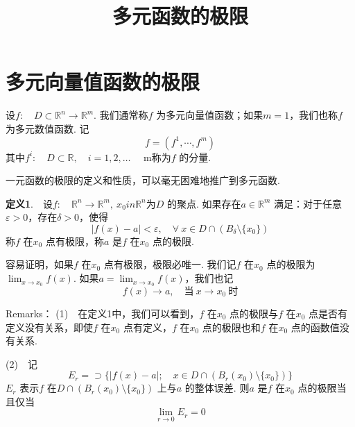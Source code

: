 \documentclass{article}
\title{多元函数的极限}
\author{}
\date{}
\begin{document}
\maketitle

\section{多元向量值函数的极限}
设\(f:\quad D \subset \mathbb{R}^n \to \mathbb{R}^{m}\). 我们通常称\(f\) 为多元向量值函数；如果\(m = 1\)，我们也称\(f\) 为多元数值函数. 记
\begin{equation*}
    f = \left( f^1,\cdots,f^m \right)
\end{equation*}
其中\(f^i:\quad D \subset \mathbb{R},\quad i = 1,2,\dots \quad \) m称为\(f\) 的分量.

\vspace{10pt}

一元函数的极限的定义和性质，可以毫无困难地推广到多元函数.

\vspace{10pt}

\textbf{定义1}.\ \ 设\(f:\quad \mathbb{R}^n\to \mathbb{R}^{m},\ x_0in \mathbb{R}^n\)为\(D\) 的聚点. 如果存在\(a \in \mathbb{R}^{m}\) 满足：对于任意\(\varepsilon > 0\)，存在\(\delta > 0\)，使得
\begin{equation*}
    | f(x) - a |< \varepsilon ,\quad \forall\ x \in D \cap \left( B_{\delta }\setminus \{x_0\}  \right)
\end{equation*}
称\(f\) 在\(x_0\) 点有极限，称\(a\) 是\(f\) 在\(x_0\) 点的极限.

\vspace{10pt}

容易证明，如果\(f\) 在\(x_0\) 点有极限，极限必唯一. 我们记\(f\) 在\(x_0\) 点的极限为\(\lim_{x \to x_0} f(x) \). 如果\(a = \lim_{x \to x_0}f(x)\)，我们也记
\begin{equation*}
    f(x) \to a,\quad \text{当}\ x \to x_0\ \text{时}
\end{equation*}

\newpage

Remarks：\newline
(1)\ \ 在定义1中，我们可以看到，\(f\) 在\(x_0\) 点的极限与\(f\) 在\(x_0\) 点是否有定义没有关系，即使\(f\) 在\(x_0\) 点有定义，\(f\) 在\(x_0\) 点的极限也和\(f\) 在\(x_0\) 点的函数值没有关系.

\vspace{10pt}

(2)\ \ 记
\begin{equation*}
    E_r = \supset \{| f(x) - a |;\quad x \in D \cap \left( B_r(x_0)\setminus \{x_0\}  \right) \}
\end{equation*}
\(E_{r}\) 表示\(f\) 在\(D \cap (B_r(x_0)\setminus \{x_0\} )\) 上与\(a\) 的整体误差. 则\(a\) 是\(f\) 在\(x_0\) 点的极限当且仅当
\begin{equation*}
    \lim_{r \to 0} E_r = 0
\end{equation*}
\end{document}
